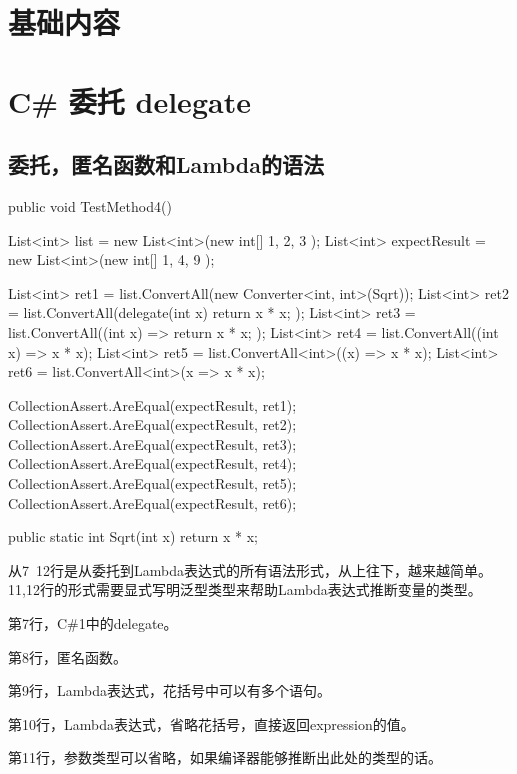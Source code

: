 \chapter{基础内容}

\chapter{C\# 委托 delegate}


\section{委托，匿名函数和Lambda的语法}

\begin{CSharp}[委托，匿名函数和Lambda]
        [TestMethod]
        public void TestMethod4()
        {
            List<int> list = new List<int>(new int[] { 1, 2, 3 });
            List<int> expectResult = new List<int>(new int[] { 1, 4, 9 });

            List<int> ret1 = list.ConvertAll(new Converter<int, int>(Sqrt));
            List<int> ret2 = list.ConvertAll(delegate(int x) { return x * x; });
            List<int> ret3 = list.ConvertAll((int x) => { return x * x; });
            List<int> ret4 = list.ConvertAll((int x) => x * x);
            List<int> ret5 = list.ConvertAll<int>((x) => x * x);
            List<int> ret6 = list.ConvertAll<int>(x => x * x);

            CollectionAssert.AreEqual(expectResult, ret1);
            CollectionAssert.AreEqual(expectResult, ret2);
            CollectionAssert.AreEqual(expectResult, ret3);
            CollectionAssert.AreEqual(expectResult, ret4);
            CollectionAssert.AreEqual(expectResult, ret5);
            CollectionAssert.AreEqual(expectResult, ret6);
        }

        public static int Sqrt(int x)
        {
            return x * x;
        }
\end{CSharp}

从7~12行是从委托到Lambda表达式的所有语法形式，从上往下，越来越简单。11,12行的形式需要显式写明泛型类型来帮助Lambda表达式推断变量的类型。

第7行，C\#1中的delegate。

第8行，匿名函数。

第9行，Lambda表达式，花括号中可以有多个语句。

第10行，Lambda表达式，省略花括号，直接返回expression的值。

第11行，参数类型可以省略，如果编译器能够推断出此处的类型的话。


